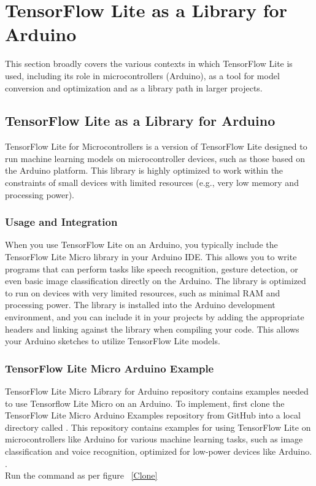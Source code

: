 %
%


\chapter{TensorFlow Lite as a Library for Arduino}

This section broadly covers the various contexts in which TensorFlow Lite is used, including its role in microcontrollers (Arduino), as a tool for model conversion and optimization and as a library path in larger projects.

\section{TensorFlow Lite as a Library for Arduino}
TensorFlow Lite for Microcontrollers is a version of TensorFlow Lite designed to run machine learning models on microcontroller devices, such as those based on the Arduino platform. This library is highly optimized to work within the constraints of small devices with limited resources (e.g., very low memory and processing power). \cite{TensorFlowGitHub:2024}

\subsection{Usage and Integration}

When you use TensorFlow Lite on an Arduino, you typically include the TensorFlow Lite Micro library in your Arduino IDE. This allows you to write programs that can perform tasks like speech recognition, gesture detection, or even basic image classification directly on the Arduino. The library is optimized to run on devices with very limited resources, such as minimal RAM and processing power. 
The library is installed into the Arduino development environment, and you can include it in your projects by adding the appropriate headers and linking against the library when compiling your code. This allows your Arduino sketches to utilize TensorFlow Lite models. \cite{TensorFlowGitHub:2024}


\subsection{TensorFlow Lite Micro Arduino Example}
TensorFlow Lite Micro Library for Arduino repository contains examples needed to use Tensorflow Lite Micro on an Arduino. To implement, first clone the TensorFlow Lite Micro Arduino Examples repository from GitHub into a local directory called . This repository contains examples for using TensorFlow Lite on microcontrollers like Arduino for various machine learning tasks, such as image classification and voice recognition, optimized for low-power devices like Arduino. \cite{TensorFlowGitHub:2024}. 
\\Run the command  as per figure ~\ref{Clone}

